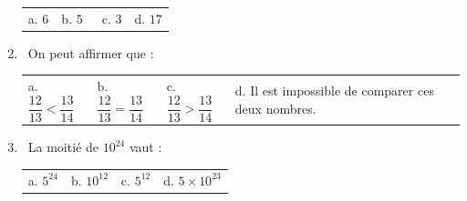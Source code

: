 \documentclass{article}
\begin{document}
\begin{enumerate}[left=0pt,itemsep=10pt]
\begin{tabular}{l@{\qquad}l@{\qquad}l@{\qquad}l}
a. $6$ & b. $5$ &  c. $3$ & d. $17$ \\

\end{tabular}



\vspace{0,8cm}



\item  On peut affirmer que : \\

\begin{tabular}{l@{\qquad}l@{\qquad}l@{\qquad}l}

a. $\dfrac{12}{13}<\dfrac{13}{14}$ & b. $\dfrac{12}{13}=\dfrac{13}{14}$ & c. $\dfrac{12}{13}>\dfrac{13}{14}$ & d. Il est impossible de comparer ces deux nombres. \\

\end{tabular}



\vspace{0,8cm}



\item  La moitié de $10^{24}$ vaut :  \\

\begin{tabular}{l@{\qquad}l@{\qquad}l@{\qquad}l}

a. $5^{24}$ & b. $10^{12}$ & c. $5^{12}$ & d. $5 \times 10^{23}$ \\

\end{tabular}



\end{enumerate}
\end{document}

